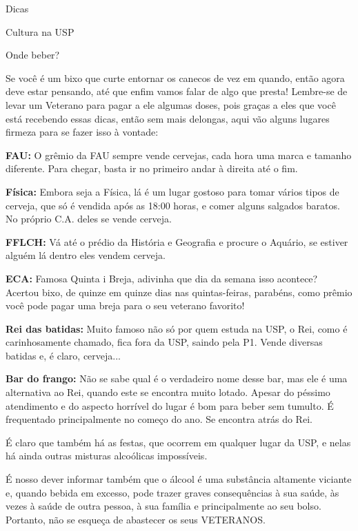 \begin{secao}{Dicas}
\begin{subsecao}{Cultura na USP}
\end{subsecao}

\begin{subsecao}{Onde beber?}

Se você é um bixo que curte entornar os canecos de vez em quando, então agora
deve estar pensando, até que enfim vamos falar de algo que presta! Lembre-se de
levar um Veterano para pagar a ele algumas doses, pois graças a eles que você
está recebendo essas dicas, então sem mais delongas, aqui vão alguns lugares
firmeza para se fazer isso à vontade:

{\bf FAU:} O grêmio da FAU sempre vende cervejas, cada hora uma marca e tamanho diferente. Para chegar, basta ir no primeiro andar à direita até o fim.

{\bf Física:} Embora seja a Física, lá é um lugar gostoso para tomar vários
tipos de cerveja, que só é vendida após as 18:00 horas, e comer alguns
salgados baratos. No próprio C.A. deles se vende cerveja.

{\bf FFLCH:} Vá até o prédio da História e Geografia e procure o Aquário, se estiver alguém lá dentro eles vendem cerveja.

{\bf ECA:} Famosa Quinta i Breja, adivinha que dia da semana isso acontece?
Acertou bixo, de quinze em quinze dias nas quintas-feiras, parabéns, como
prêmio você pode pagar uma breja para o seu veterano favorito!

{\bf Rei das batidas:} Muito famoso não só por quem estuda na USP, o Rei,
como é carinhosamente chamado, fica fora da USP, saindo pela P1. Vende
diversas batidas e, é claro, cerveja...

{\bf Bar do frango:} Não se sabe qual é o verdadeiro nome desse bar, mas ele é
uma alternativa ao Rei, quando este se encontra muito lotado. Apesar do péssimo atendimento e do aspecto horrível do lugar é bom para beber sem
tumulto. É frequentado principalmente no começo do ano. Se encontra atrás do
Rei.

É claro que também há as festas, que ocorrem em qualquer lugar da USP, e nelas
há ainda outras misturas alcoólicas impossíveis.

É nosso dever informar também que o álcool é uma substância altamente viciante
e, quando bebida em excesso, pode trazer graves consequências à sua saúde, às
vezes à saúde de outra pessoa, à sua família e principalmente ao seu bolso.
Portanto, não se esqueça de abastecer os seus VETERANOS.


\end{subsecao}
\end{secao}

